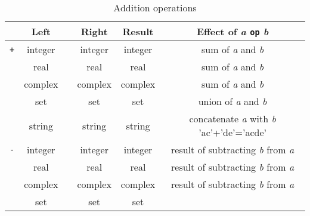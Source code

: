 {\begin{table}
\caption{Addition operations\label{addops}}
{\centering \begin{tabular}{cccccc}
\hline 
{\small }&
{\small Left}&
{\small }&
{\small Right}&
{\small Result}&
{\small Effect of} \emph{\small a} \texttt{\small op} \emph{\small b}{\small }\\
\hline 
\hline 
\texttt{\footnotesize +}{\footnotesize }&
{\footnotesize integer}&
{\footnotesize }&
{\footnotesize integer}&
{\footnotesize integer}&
{\footnotesize sum of} \emph{\footnotesize a} {\footnotesize and} \emph{\footnotesize b}{\footnotesize }\\
{\footnotesize }&
{\footnotesize real}&
{\footnotesize }&
{\footnotesize real}&
{\footnotesize real}&
{\footnotesize sum of} \emph{\footnotesize a} {\footnotesize and} \emph{\footnotesize b}{\footnotesize }\\
{\footnotesize }&
{\footnotesize complex}&
{\footnotesize }&
{\footnotesize complex}&
{\footnotesize complex}&
{\footnotesize sum of} \emph{\footnotesize a} {\footnotesize and} \emph{\footnotesize b}{\footnotesize }\\
{\footnotesize }&
{\footnotesize set}&
{\footnotesize }&
{\footnotesize set}&
{\footnotesize set}&
{\footnotesize union of} \emph{\footnotesize a} {\footnotesize and} \emph{\footnotesize b}{\footnotesize }\\
{\footnotesize }&
{\footnotesize string}&
{\footnotesize }&
{\footnotesize string}&
{\footnotesize string}&
{\footnotesize concatenate\index{concatenate}} \emph{\footnotesize a} {\footnotesize with}
\emph{\footnotesize b} {\footnotesize 'ac'+'de'='acde'}\\
\texttt{\footnotesize -}{\footnotesize }&
{\footnotesize integer}&
{\footnotesize }&
{\footnotesize integer}&
{\footnotesize integer}&
{\footnotesize result of subtracting} \emph{\footnotesize b} {\footnotesize from}
\emph{\footnotesize a}{\footnotesize }\\
{\footnotesize }&
{\footnotesize real}&
{\footnotesize }&
{\footnotesize real}&
{\footnotesize real}&
{\footnotesize result of subtracting} \emph{\footnotesize b} {\footnotesize from}
\emph{\footnotesize a}{\footnotesize }\\
{\footnotesize }&
{\footnotesize complex}&
{\footnotesize }&
{\footnotesize complex}&
{\footnotesize complex}&
{\footnotesize result of subtracting} \emph{\footnotesize b} {\footnotesize from}
\emph{\footnotesize a}{\footnotesize }\\
{\footnotesize }&
{\footnotesize set}&
{\footnotesize }&
{\footnotesize set}&
{\footnotesize set}&

\end{tabular}}
\end{table}}

